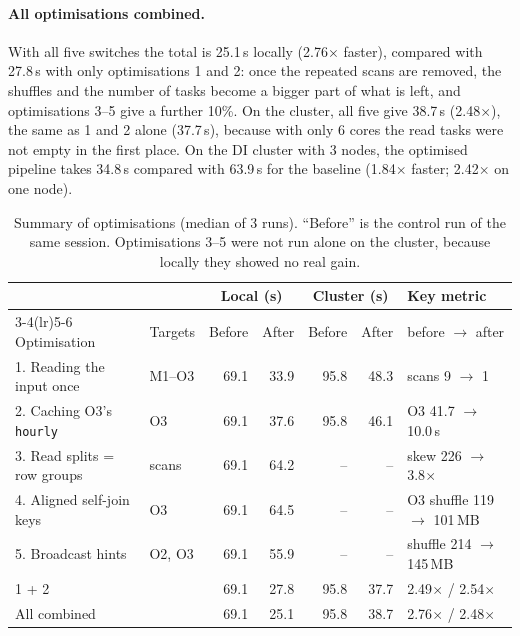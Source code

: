 \documentclass[10pt,a4paper]{article}
\begin{document}
\paragraph{All optimisations combined.} With all five switches the total is 25.1\,s locally (2.76$\times$ faster), compared with 27.8\,s with only optimisations 1 and 2: once the repeated scans are removed, the shuffles and the number of tasks become a bigger part of what is left, and optimisations 3--5 give a further 10\%. On the cluster, all five give 38.7\,s (2.48$\times$), the same as 1 and 2 alone (37.7\,s), because with only 6 cores the read tasks were not empty in the first place. On the DI cluster with 3 nodes, the optimised pipeline takes 34.8\,s compared with 63.9\,s for the baseline (1.84$\times$ faster; 2.42$\times$ on one node).

\begin{table}[!htb]
\centering\footnotesize
\caption{Summary of optimisations (median of 3 runs). ``Before'' is the control run of the same session. Optimisations 3--5 were not run alone on the cluster, because locally they showed no real gain.}
\label{tab:summary}
\begin{tabular}{@{}llrrrrl@{}}
\toprule
& & \multicolumn{2}{c}{Local (s)} & \multicolumn{2}{c}{Cluster (s)} & Key metric \\
\cmidrule(lr){3-4}\cmidrule(lr){5-6}
Optimisation & Targets & Before & After & Before & After & before $\rightarrow$ after \\
\midrule
1. Reading the input once      & M1--O3 & 69.1 & 33.9 & 95.8 & 48.3 & scans 9 $\rightarrow$ 1 \\
2. Caching O3's \texttt{hourly}& O3     & 69.1 & 37.6 & 95.8 & 46.1 & O3 41.7 $\rightarrow$ 10.0\,s \\
3. Read splits = row groups    & scans  & 69.1 & 64.2 & --   & --   & skew 226 $\rightarrow$ 3.8$\times$ \\
4. Aligned self-join keys      & O3     & 69.1 & 64.5 & --   & --   & O3 shuffle 119 $\rightarrow$ 101\,MB \\
5. Broadcast hints             & O2, O3 & 69.1 & 55.9 & --   & --   & shuffle 214 $\rightarrow$ 145\,MB \\
\midrule
1 + 2                          &        & 69.1 & 27.8 & 95.8 & 37.7 & 2.49$\times$ / 2.54$\times$ \\
All combined                   &        & 69.1 & 25.1 & 95.8 & 38.7 & 2.76$\times$ / 2.48$\times$ \\
\bottomrule
\end{tabular}
\end{table}
\end{document}
